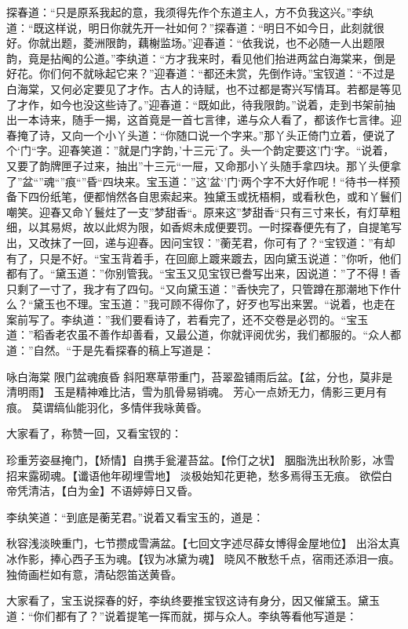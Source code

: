 \documentclass[12pt,oneside]{book}
\begin{document}
探春道：“只是原系我起的意，我须得先作个东道主人，方不负我这兴。”李纨道：“既这样说，明日你就先开一社如何？”探春道：“明日不如今日，此刻就很好。你就出题，菱洲限韵，藕榭监场。”迎春道：“依我说，也不必随一人出题限韵，竟是拈阄的公道。”李纨道：“方才我来时，看见他们抬进两盆白海棠来，倒是好花。你们何不就咏起它来？”迎春道：“都还未赏，先倒作诗。”宝钗道：“不过是白海棠，又何必定要见了才作。古人的诗赋，也不过都是寄兴写情耳。若都是等见了才作，如今也没这些诗了。”迎春道：“既如此，待我限韵。”说着，走到书架前抽出一本诗来，随手一揭，这首竟是一首七言律，递与众人看了，都该作七言律。迎春掩了诗，又向一个小丫头道：“你随口说一个字来。”那丫头正倚门立着，便说了个‘门“字。迎春笑道：”就是门字韵，’十三元‘了。头一个韵定要这’门‘字。“说着，又要了韵牌匣子过来，抽出”十三元“一屉，又命那小丫头随手拿四块。那丫头便拿了”盆“”魂“”痕“”昏“四块来。宝玉道：”这’盆‘’门‘两个字不大好作呢！“待书一样预备下四份纸笔，便都悄然各自思索起来。独黛玉或抚梧桐，或看秋色，或和丫鬟们嘲笑。迎春又命丫鬟炷了一支”梦甜香“。原来这”梦甜香“只有三寸来长，有灯草粗细，以其易烬，故以此烬为限，如香烬未成便要罚。一时探春便先有了，自提笔写出，又改抹了一回，递与迎春。因问宝钗：”蘅芜君，你可有了？“宝钗道：”有却有了，只是不好。“宝玉背着手，在回廊上踱来踱去，因向黛玉说道：”你听，他们都有了。“黛玉道：”你别管我。“宝玉又见宝钗已誊写出来，因说道：”了不得！香只剩了一寸了，我才有了四句。“又向黛玉道：”香快完了，只管蹲在那潮地下作什么？“黛玉也不理。宝玉道：”我可顾不得你了，好歹也写出来罢。“说着，也走在案前写了。李纨道：”我们要看诗了，若看完了，还不交卷是必罚的。“宝玉道：”稻香老农虽不善作却善看，又最公道，你就评阅优劣，我们都服的。“众人都道：”自然。“于是先看探春的稿上写道是：

咏白海棠 限门盆魂痕昏
斜阳寒草带重门，苔翠盈铺雨后盆。【盆，分也，莫非是清明雨】
玉是精神难比洁，雪为肌骨易销魂。
芳心一点娇无力，倩影三更月有痕。
莫谓缟仙能羽化，多情伴我咏黄昏。

大家看了，称赞一回，又看宝钗的：

珍重芳姿昼掩门，【矫情】自携手瓮灌苔盆。【伶仃之状】
胭脂洗出秋阶影，冰雪招来露砌魂。【谶语他年砌埋雪地】
淡极始知花更艳，愁多焉得玉无痕。
欲偿白帝凭清洁，【白为金】不语婷婷日又昏。

李纨笑道：“到底是蘅芜君。”说着又看宝玉的，道是：

秋容浅淡映重门，七节攒成雪满盆。【七回文字述尽薛女博得金屋地位】
出浴太真冰作影，捧心西子玉为魂。【钗为冰黛为魂】
晓风不散愁千点，宿雨还添泪一痕。
独倚画栏如有意，清砧怨笛送黄昏。

大家看了，宝玉说探春的好，李纨终要推宝钗这诗有身分，因又催黛玉。黛玉道：“你们都有了？”说着提笔一挥而就，掷与众人。李纨等看他写道是：
\end{document}
